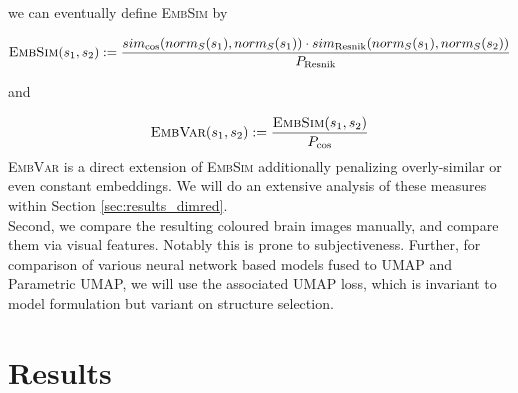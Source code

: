 \documentclass[]{article}
\begin{document}
we can eventually define \textsc{EmbSim} by

\begin{equation}
	\label{equ:embsim}
	\textsc{EmbSim}(s_1,s_2):= \frac{sim_\text{cos}(norm_S(s_1), norm_S(s_1)) \cdot sim_\text{Resnik}(norm_S(s_1), norm_S(s_2))}{ P_{\text{Resnik}}}
\end{equation}

and

\begin{equation}
	\label{equ:embvar}
	\textsc{EmbVar}(s_1,s_2):= \frac{\textsc{EmbSim}(s_1, s_2)}{ P_{\text{cos}} }
\end{equation}
\textsc{EmbVar} is a direct extension of \textsc{EmbSim} additionally penalizing overly-similar or even constant embeddings. We will do an extensive analysis of these measures within Section \ref{sec:results_dimred}.\\
Second, we compare the resulting coloured brain images manually, and compare them via visual features. Notably this is prone to subjectiveness.
Further, for comparison of various neural network based models fused to UMAP and Parametric UMAP, we will use the associated UMAP loss, which is invariant to model formulation but variant on structure selection.



\newpage
\section{Results}
\label{sec:results}
\end{document}
